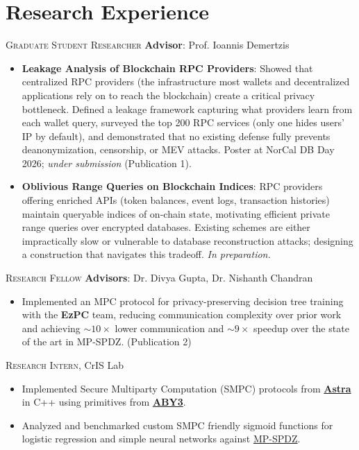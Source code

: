 \documentclass[13pt, a4paper, roman]{moderncv} %
\begin{document}
\section{Research Experience}

{\textsc{Graduate Student Researcher}
\newline{}\textbf{Advisor}: Prof. Ioannis Demertzis
\begin{itemize}
\item \textbf{Leakage Analysis of Blockchain RPC Providers}: Showed that centralized RPC providers (the infrastructure most wallets and decentralized applications rely on to reach the blockchain) create a critical privacy bottleneck. Defined a leakage framework capturing what providers learn from each wallet query, surveyed the top 200 RPC services (only one hides users' IP by default), and demonstrated that no existing defense fully prevents deanonymization, censorship, or MEV attacks. Poster at NorCal DB Day 2026; \emph{under submission} (Publication 1).
\item \textbf{Oblivious Range Queries on Blockchain Indices}: RPC providers offering enriched APIs (token balances, event logs, transaction histories) maintain queryable indices of on-chain state, motivating efficient private range queries over encrypted databases. Existing schemes are either impractically slow or vulnerable to database reconstruction attacks; designing a construction that navigates this tradeoff. \emph{In preparation.}
\end{itemize}}

\vspace{2mm}
{\textsc{Research Fellow}
\newline{}\textbf{Advisors}: Dr. Divya Gupta, Dr. Nishanth Chandran
\begin{itemize}
\item Implemented an MPC protocol for privacy-preserving decision tree training with the \textbf{EzPC} team, reducing communication complexity over prior work and achieving ${\sim}10{\times}$ lower communication and ${\sim}9{\times}$ speedup over the state of the art in MP-SPDZ. (Publication 2)
\end{itemize}}

\vspace{2mm}
{\textsc{Research Intern}, CrIS Lab
\begin{itemize}
\item Implemented Secure Multiparty Computation (SMPC) protocols from \textcolor{link}{\href{https://eprint.iacr.org/2019/429.pdf}{\textbf{Astra}}} in C++ using primitives from \textcolor{link}{\href{https://github.com/ladnir/aby3}{\textbf{ABY3}}}.
\item Analyzed and benchmarked custom SMPC friendly sigmoid functions for logistic regression and simple neural networks against \textcolor{link}{\href{https://github.com/data61/MP-SPDZ}{MP-SPDZ}}.
\end{itemize}}
\end{document}
